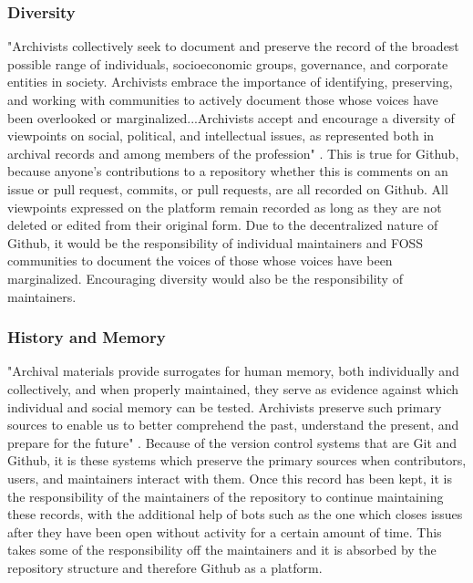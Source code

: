 \subsubsection{Diversity}

"Archivists collectively seek to document and preserve the record of the broadest possible range of individuals, socioeconomic groups, governance, and corporate entities in society. Archivists embrace the importance of identifying, preserving, and working with communities to actively document those whose voices have been overlooked or marginalized...Archivists accept and encourage a diversity of viewpoints on social, political, and intellectual issues, as represented both in archival records and among members of the profession" \cite{rubin2016foundationslis}. This is true for Github, because anyone's contributions to a repository whether this is comments on an issue or pull request, commits, or pull requests, are all recorded on Github. All viewpoints expressed on the platform remain recorded as long as they are not deleted or edited from their original form. Due to the decentralized nature of Github, it would be the responsibility of individual maintainers and FOSS communities to document the voices of those whose voices have been marginalized. Encouraging diversity would also be the responsibility of maintainers. 


\subsubsection{History and Memory}

"Archival materials provide surrogates for human memory, both individually and collectively, and when properly maintained, they serve as evidence against which individual and social memory can be tested. Archivists preserve such primary sources to enable us to better comprehend the past, understand the present, and prepare for the future" \cite{rubin2016foundationslis}. Because of the version control systems that are Git and Github, it is these systems which preserve the primary sources when contributors, users, and maintainers interact with them. Once this record has been kept, it is the responsibility of the maintainers of the repository to continue maintaining these records, with the additional help of bots such as the one which closes issues after they have been open without activity for a certain amount of time. This takes some of the responsibility off the maintainers and it is absorbed by the repository structure and therefore Github as a platform.

